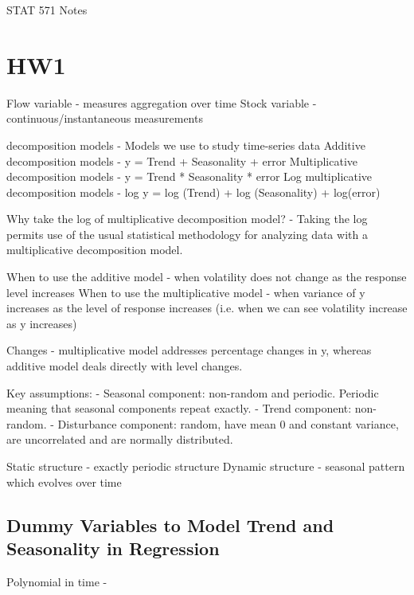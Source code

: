 \documentclass{article}
\begin{document}
\begin{center}
STAT 571 Notes	

\end{center}

\section{HW1}

Flow variable - measures aggregation over time
Stock variable - continuous/instantaneous measurements

decomposition models - Models we use to study time-series data
Additive decomposition models - y = Trend + Seasonality + error
Multiplicative decomposition models - y = Trend * Seasonality * error
Log multiplicative decomposition models - log y = log (Trend) + log (Seasonality) + log(error)

Why take the log of multiplicative decomposition model? - Taking the log permits use of the usual statistical methodology for analyzing data with a multiplicative decomposition model. 

When to use the additive model - when volatility does not change as the response level increases
When to use the multiplicative model - when variance of y increases as the level of response increases (i.e. when we can see volatility increase as y increases)

Changes - multiplicative model addresses percentage changes in y, whereas additive model deals directly with level changes.

Key assumptions:
	- Seasonal component: non-random and periodic. Periodic meaning that seasonal components repeat exactly.
	- Trend component: non-random.
	- Disturbance component: random, have mean 0 and constant variance, are uncorrelated and are normally distributed.

Static structure - exactly periodic structure 
Dynamic structure - seasonal pattern which evolves over time

\subsection{Dummy Variables to Model Trend and Seasonality in Regression}
Polynomial in time - 
\end{document}
